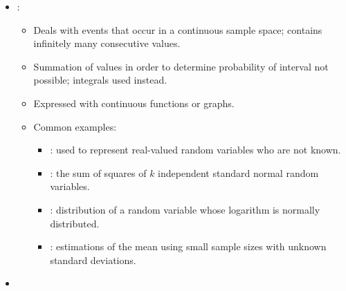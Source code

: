\begin{itemize}
\begin{itemize}
      \item {}: 
      \begin{itemize}
        \item Deals with events that occur in a continuous sample space; contains infinitely many consecutive values. 
        \item Summation of values in order to determine probability of interval not possible; integrals used instead.
        \item Expressed with continuous functions or graphs.
        \item Common examples:
        \begin{multicols}{2}
          \begin{itemize}
            \item {}: used to represent real-valued random variables who are not known.
            \item {}: the sum of squares of \(k\) independent standard normal random variables.
            \item {}: distribution of a random variable whose logarithm is normally distributed.
            \item {}: estimations of the mean using small sample sizes with unknown standard deviations.
          \end{itemize}
        \end{multicols}
      \end{itemize}
      \item {}
    \end{itemize}
\end{itemize}

